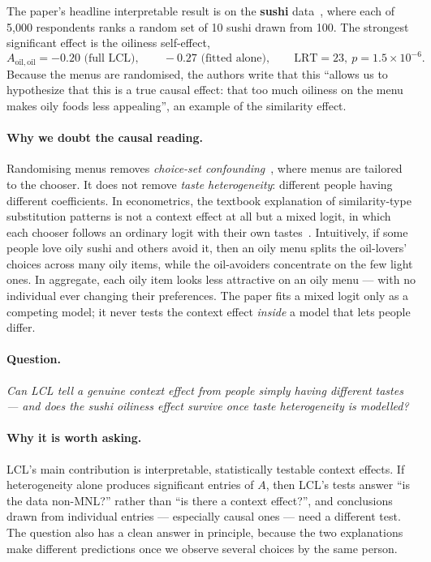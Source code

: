 \documentclass[11pt,a4paper]{article}
\theoremstyle{remark}
\newcommand{\Aoo}{A_{\mathrm{oil,oil}}}
\begin{document}
The paper's headline interpretable result is on the \textbf{sushi} data~\cite{kamishima03}, where each of
5{,}000 respondents ranks a random set of 10 sushi drawn from 100. The strongest significant effect is
the oiliness self-effect,
\[
\Aoo = -0.20 \text{ (full LCL)},\qquad -0.27 \text{ (fitted alone)},\qquad \text{LRT}=23,\ p=1.5\times 10^{-6}.
\]
Because the menus are randomised, the authors write that this ``allows us to hypothesize that this is a
true causal effect: that too much oiliness on the menu makes oily foods less appealing'', an example of
the similarity effect.

\paragraph{Why we doubt the causal reading.}
Randomising menus removes \emph{choice-set confounding}~\cite{tub21}, where menus are tailored to
the chooser. It does not remove \emph{taste heterogeneity}: different people having different
coefficients. In econometrics, the textbook explanation of similarity-type substitution patterns is not
a context effect at all but a mixed logit, in which each chooser follows an ordinary logit with their own
tastes~\cite{mcfadden00,train09}. Intuitively, if some people love oily sushi and others avoid it, then an
oily menu splits the oil-lovers' choices across many oily items, while the oil-avoiders concentrate on the
few light ones. In aggregate, each oily item looks less attractive on an oily menu --- with no individual
ever changing their preferences. The paper fits a mixed logit only as a competing model; it never tests the
context effect \emph{inside} a model that lets people differ.

\paragraph{Question.}
\emph{Can LCL tell a genuine context effect from people simply having different tastes --- and does the
sushi oiliness effect survive once taste heterogeneity is modelled?}

\paragraph{Why it is worth asking.}
LCL's main contribution is interpretable, statistically testable context effects. If heterogeneity alone
produces significant entries of $A$, then LCL's tests answer ``is the data non-MNL?'' rather than ``is
there a context effect?'', and conclusions drawn from individual entries --- especially causal ones --- need a
different test. The question also has a clean answer in principle, because the two explanations make
different predictions once we observe several choices by the same person.
\end{document}

